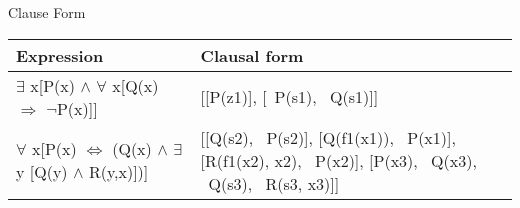 {\begin{center}
Clause Form
\end{center}
\begin{table}[htb]
\begin{tabular}{| p{7cm}  | p{7cm} | }
 \hline
Expression  & Clausal form
\\ \hline

$\exists$ x[P(x) $\wedge$ $\forall$ x[Q(x) $\Rightarrow$ $\neg$P(x)]] & [[P(z1)], [~P(s1), ~Q(s1)]] 
\\ \hline
$\forall$ x[P(x) $\Leftrightarrow$ (Q(x) $\wedge$ $\exists$ y [Q(y) $\wedge$ R(y,x)])] & [[Q(s2), ~P(s2)], [Q(f1(x1)), ~P(x1)], [R(f1(x2), x2), ~P(x2)], [P(x3), ~Q(x3), ~Q(s3), ~R(s3, x3)]]

\\ \hline
\end{tabular}
\end{table}
}
